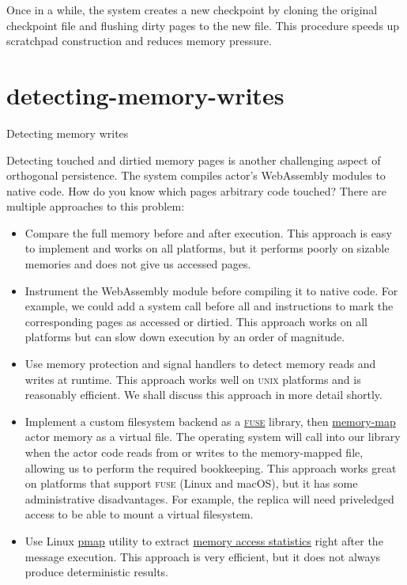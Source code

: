 \documentclass{article}
\begin{document}
Once in a while, the system creates a new checkpoint by cloning the original checkpoint file and flushing dirty pages to the new file.
This procedure speeds up scratchpad construction and reduces memory pressure.

\section{detecting-memory-writes}{Detecting memory writes}

Detecting touched and dirtied memory pages is another challenging aspect of orthogonal persistence.
The system compiles actor's WebAssembly modules to native code.
How do you know which pages arbitrary code touched?
There are multiple approaches to this problem:
\begin{itemize}
  \item
    Compare the full memory before and after execution.
    This approach is easy to implement and works on all platforms, but it performs poorly on sizable memories and does not give us accessed pages.
  \item
    Instrument the WebAssembly module before compiling it to native code.
    For example, we could add a system call before all  and  instructions to mark the corresponding pages as accessed or dirtied.
    This approach works on all platforms but can slow down execution by an order of magnitude.
  \item
    Use memory protection and signal handlers to detect memory reads and writes at runtime.
    This approach works well on \textsc{unix} platforms and is reasonably efficient.
    We shall discuss this approach in more detail shortly.
  \item
    Implement a custom filesystem backend as a \href{https://en.wikipedia.org/wiki/Filesystem_in_Userspace}{\textsc{fuse}} library, then \href{https://man7.org/linux/man-pages/man2/mmap.2.html}{memory-map} actor memory as a virtual file.
    The operating system will call into our library when the actor code reads from or writes to the memory-mapped file, allowing us to perform the required bookkeeping.
    This approach works great on platforms that support \textsc{fuse} (Linux and macOS), but it has some administrative disadvantages.
    For example, the replica will need priveledged access to be able to mount a virtual filesystem.
  \item
    Use Linux \href{https://man7.org/linux/man-pages/man1/pmap.1.html}{pmap} utility to extract \href{https://techtalk.intersec.com/2013/07/memory-part-2-understanding-process-memory/#pmap-detailed-mapping}{memory access statistics} right after the message execution.
    This approach is very efficient, but it does not always produce deterministic results.
\end{itemize}
\end{document}

